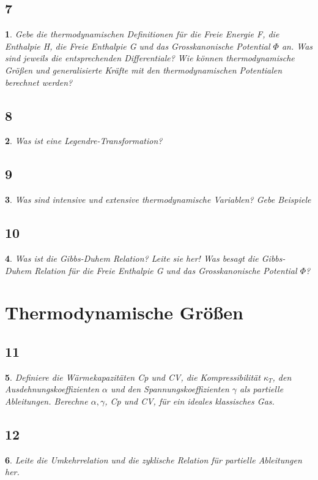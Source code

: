 \documentclass[12pt,a4paper]{report}
\newtheorem{myfrag}{}%
\begin{document}
\subsection{7}
\begin{myfrag}
Gebe die thermodynamischen Definitionen für die Freie Energie F, die
Enthalpie H, die Freie Enthalpie G und das Grosskanonische Potential $\Phi $
an. Was sind jeweils die entsprechenden Differentiale? Wie können
thermodynamische Größen und generalisierte Kräfte mit den
thermodynamischen Potentialen berechnet werden?
\end{myfrag}
\subsection{8}
\begin{myfrag}
Was ist eine Legendre-Transformation?
\end{myfrag}
\subsection{9}
\begin{myfrag}
Was sind intensive und extensive thermodynamische Variablen? Gebe
Beispiele
\end{myfrag}
\subsection{10}
\begin{myfrag}
Was ist die Gibbs-Duhem Relation? Leite sie her! Was besagt die Gibbs-
Duhem Relation für die Freie Enthalpie G und das Grosskanonische
Potential $\Phi$?
\end{myfrag}
\section{Thermodynamische Größen}
\subsection{11}
\begin{myfrag}
Definiere die Wärmekapazitäten Cp und CV, die Kompressibilität $\kappa_T$, den
Ausdehnungskoeffizienten $\alpha$ und den Spannungskoeffizienten $\gamma$ als
partielle Ableitungen. Berechne $\alpha, \gamma$, Cp und CV, für ein ideales
klassisches Gas.
\end{myfrag}
\subsection{12}
\begin{myfrag}
Leite die Umkehrrelation und die zyklische Relation für partielle
Ableitungen her.
\end{myfrag}
\end{document}
